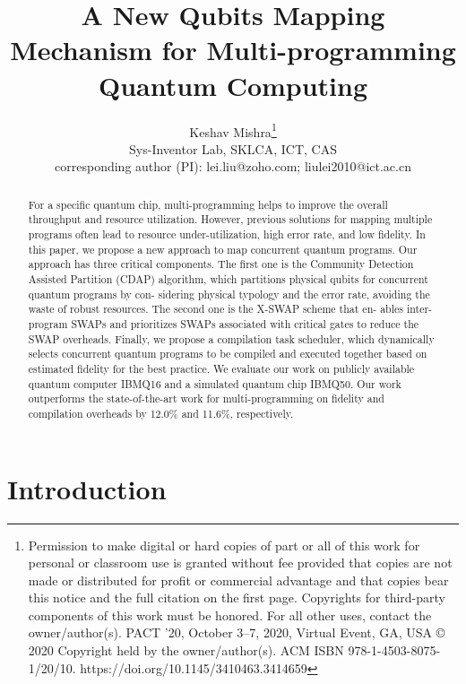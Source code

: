 \documentclass{article}
\title{\textbf{A New Qubits Mapping Mechanism for Multi-programming Quantum Computing}}
\author{{\Large Keshav Mishra\thanks{Permission to make digital or hard copies of part or all of this work for personal or
			classroom use is granted without fee provided that copies are not made or distributed
			for profit or commercial advantage and that copies bear this notice and the full citation
			on the first page. Copyrights for third-party components of this work must be honored.
			For all other uses, contact the owner/author(s).
			PACT ’20, October 3–7, 2020, Virtual Event, GA, USA
			© 2020 Copyright held by the owner/author(s).
			ACM ISBN 978-1-4503-8075-1/20/10.
			https://doi.org/10.1145/3410463.3414659}}\\
	{\normalsize Sys-Inventor Lab, SKLCA, ICT, CAS}\\
	{\normalsize *corresponding author (PI): lei.liu@zoho.com; liulei2010@ict.ac.cn}
}
\date{}
\begin{document}
	
	\maketitle
	
	\begin{abstract}
		For a specific quantum chip, multi-programming helps to improve
		the overall throughput and resource utilization. However, previous
		solutions for mapping multiple programs often lead to resource
		under-utilization, high error rate, and low fidelity. In this paper, we
		propose a new approach to map concurrent quantum programs.
		Our approach has three critical components. The first one is the
		Community Detection Assisted Partition (CDAP) algorithm, which
		partitions physical qubits for concurrent quantum programs by con-
		sidering physical typology and the error rate, avoiding the waste
		of robust resources. The second one is the X-SWAP scheme that en-
		ables inter-program SWAPs and prioritizes SWAPs associated with
		critical gates to reduce the SWAP overheads. Finally, we propose a
		compilation task scheduler, which dynamically selects concurrent
		quantum programs to be compiled and executed together based
		on estimated fidelity for the best practice. We evaluate our work
		on publicly available quantum computer IBMQ16 and a simulated
		quantum chip IBMQ50. Our work outperforms the state-of-the-art
		work for multi-programming on fidelity and compilation overheads
		by 12.0\% and 11.6\%, respectively.
	\end{abstract}
	
	\section{Introduction}
	
\end{document}
